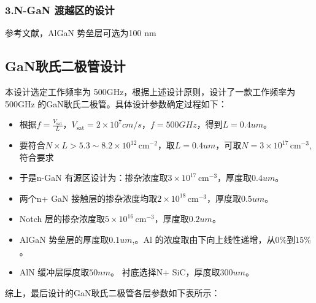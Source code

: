\documentclass[12pt,hyperref,a4paper,UTF8]{ctexart}
\begin{document}
\subsubsection*{3.N-GaN 渡越区的设计}
参考文献，AlGaN 势垒层可选为100 nm\cite{ZDWB201505001365}


\subsection{GaN耿氏二极管设计}

本设计选定工作频率为 500GHz，根据上述设计原则，设计了一款工作频率为 500GHz 的GaN耿氏二极管。具体设计参数确定过程如下：

\begin{itemize}
  \item 根据$f = \frac{V_{\text{sat}}}{L}$，$V_{\text{sat}}=2 \times 10^7 cm / s$，$f=500GHz$，得到$L=0.4um$。
  \item 要符合$N \times L > 5.3 \sim 8.2 \times 10^{12} \, \text{cm}^{-2}$，取$L=0.4um$，可取$N=3 \times 10^{17} \, \text{cm}^{-3}$,符合要求
  \item 于是n-GaN 有源区设计为：掺杂浓度取$3 \times 10^{17} \, \text{cm}^{-3}$，厚度取$0.4um$。
  \item 两个n+ GaN 接触层的掺杂浓度均取$2 \times 10^{18} \, \text{cm}^{-3}$，厚度取$0.5um$\cite{cn104022222b}。
  \item Notch 层的掺杂浓度取$5 \times 10^{16} \, \text{cm}^{-3}$，厚度取$0.2um$。
  \item AlGaN 势垒层的厚度取$0.1um$,。Al 的浓度取由下向上线性递增，从$0\%$到$15\%$\cite{cn104022222b}。
  \item AlN 缓冲层厚度取$50nm$。 衬底选择N+ SiC，厚度取$300um$。
\end{itemize}

综上，最后设计的GaN耿氏二极管各层参数如下表所示：
\end{document}
